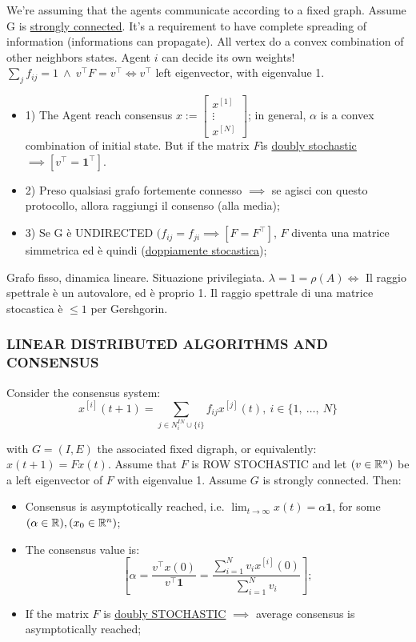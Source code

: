 We're assuming that the agents communicate according to a fixed graph. Assume G is \underline{strongly connected}. It's a requirement to have complete spreading of information (informations can propagate). All vertex do a convex combination of other neighbors states. Agent $i$ can decide its own weights! $\sum_{j}{f_{ij}}=1\ \land\ v^\top F = v^\top \iff v^\top$ left eigenvector, with eigenvalue 1.

\begin{itemize}
\item{1)} The Agent reach consensus $x:=\begin{bmatrix}x^{[1]}\\ \vdots\\ x^{[N]}\end{bmatrix}$; in general, $\alpha$ is a convex combination of initial state. But if the matrix $F$is \underline{doubly stochastic} $\implies [v^\top=\mathbf{1}^\top]$.
\item{2)} Preso qualsiasi grafo fortemente connesso $\implies$ se agisci con questo protocollo, allora raggiungi il consenso (alla media);
\item{3)} Se G è UNDIRECTED $(f_{ij}=f_{ji} \implies [F=F^\top]$, $F$ diventa una matrice simmetrica ed è quindi (\underline{doppiamente stocastica});
\end{itemize}

Grafo fisso, dinamica lineare. Situazione privilegiata. $\lambda=1=\rho(A) \iff$ Il raggio spettrale è un autovalore, ed è proprio 1. Il raggio spettrale di una matrice stocastica è $\leq 1$ per Gershgorin.

\subsubsection{LINEAR DISTRIBUTED ALGORITHMS AND CONSENSUS}

\begin{thrm}
Consider the consensus system:
\[
	x^{[i]}(t+1) = \sum_{j\in N_i^{IN}\cup{\{i\}}}{f_{ij}x^{[j]}(t)},\ i\in\{1,\ \dots,\ N\}
\]

with $G=(I,E)$ the associated fixed digraph, or equivalently: $x(t+1)=Fx(t)$. Assume that $F$ is ROW STOCHASTIC and let $(v\in\mathbb{R}^n)$ be a left eigenvector of $F$ with eigenvalue 1. Assume $G$ is strongly connected. Then:
\begin{itemize}
\item Consensus is asymptotically reached, i.e. $\lim_{t\to\infty}{x(t)} = \alpha\mathbf{1}$, for some $(\alpha\in\mathbb{R}),(x_0\in\mathbb{R}^n)$;
\item The consensus value is:
\[
	[\alpha = \frac{v^\top x(0)}{v^\top \mathbf{1}} = \frac{\sum_{i=1}^N{v_ix^{[i]}(0)}}{\sum_{i=1}^N{v_i}}];
\]
\item If the matrix $F$ is \underline{doubly STOCHASTIC} $\implies$ average consensus is asymptotically reached;
\end{itemize}
\end{thrm}

